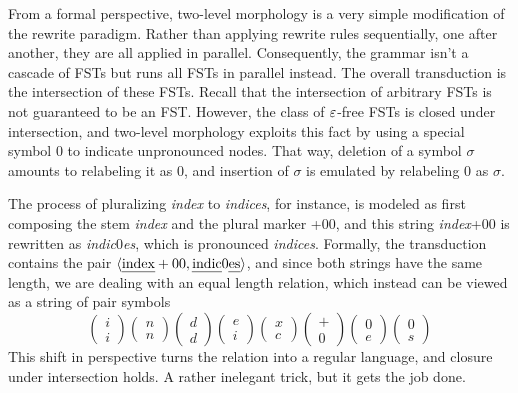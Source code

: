 From a formal perspective, two-level morphology is a very simple modification of the rewrite paradigm.
Rather than applying rewrite rules sequentially, one after another, they are all applied in parallel.
Consequently, the grammar isn't a cascade of FSTs but runs all FSTs in parallel instead.
The overall transduction is the intersection of these FSTs.
Recall that the intersection of arbitrary FSTs is not guaranteed to be an FST\@.
However, the class of $\varepsilon$-free FSTs is closed under intersection, and two-level morphology exploits this fact by using a special symbol $0$ to indicate unpronounced nodes.
That way, deletion of a symbol $\sigma$ amounts to relabeling it as $0$, and insertion of $\sigma$ is emulated by relabeling $0$ as $\sigma$.

The process of pluralizing \emph{index} to \emph{indices}, for instance, is modeled as first composing the stem \emph{index} and the plural marker +00, and this string \emph{index}+00 is rewritten as \emph{indic}0\emph{es}, which is pronounced \emph{indices}.
Formally, the transduction contains the pair $\left \langle \text{\emph{index}}+00,\text{\emph{indic}}0\text{\emph{es}} \right \rangle $, and since both strings have the same length, we are dealing with an equal length relation, which instead can be viewed as a string of pair symbols
\[
    \begin{pmatrix}
        i\\i
    \end{pmatrix}
    \begin{pmatrix}
        n\\n
    \end{pmatrix}
    \begin{pmatrix}
        d\\d
    \end{pmatrix}
    \begin{pmatrix}
        e\\i
    \end{pmatrix}
    \begin{pmatrix}
        x\\c
    \end{pmatrix}
    \begin{pmatrix}
        +\\0
    \end{pmatrix}
    \begin{pmatrix}
        0\\e
    \end{pmatrix}
    \begin{pmatrix}
        0\\s
    \end{pmatrix}
\]
This shift in perspective turns the relation into a regular language, and closure under intersection holds.
A rather inelegant trick, but it gets the job done.

